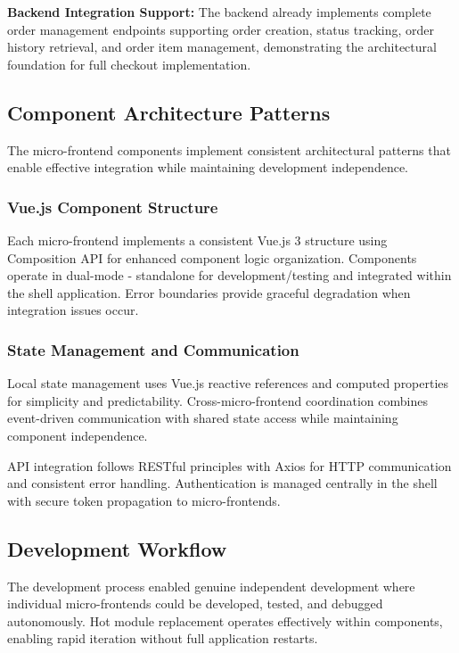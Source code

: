 \documentclass[12pt,a4paper]{report}
\begin{document}
\textbf{Backend Integration Support:} The backend already implements complete order management endpoints supporting order creation, status tracking, order history retrieval, and order item management, demonstrating the architectural foundation for full checkout implementation.

\subsection{Component Architecture Patterns}

The micro-frontend components implement consistent architectural patterns that enable effective integration while maintaining development independence.

\subsubsection{Vue.js Component Structure}

Each micro-frontend implements a consistent Vue.js 3 structure using Composition API for enhanced component logic organization. Components operate in dual-mode - standalone for development/testing and integrated within the shell application. Error boundaries provide graceful degradation when integration issues occur.

\subsubsection{State Management and Communication}

Local state management uses Vue.js reactive references and computed properties for simplicity and predictability. Cross-micro-frontend coordination combines event-driven communication with shared state access while maintaining component independence.

API integration follows RESTful principles with Axios for HTTP communication and consistent error handling. Authentication is managed centrally in the shell with secure token propagation to micro-frontends.

\subsection{Development Workflow}

The development process enabled genuine independent development where individual micro-frontends could be developed, tested, and debugged autonomously. Hot module replacement operates effectively within components, enabling rapid iteration without full application restarts.
\end{document}
